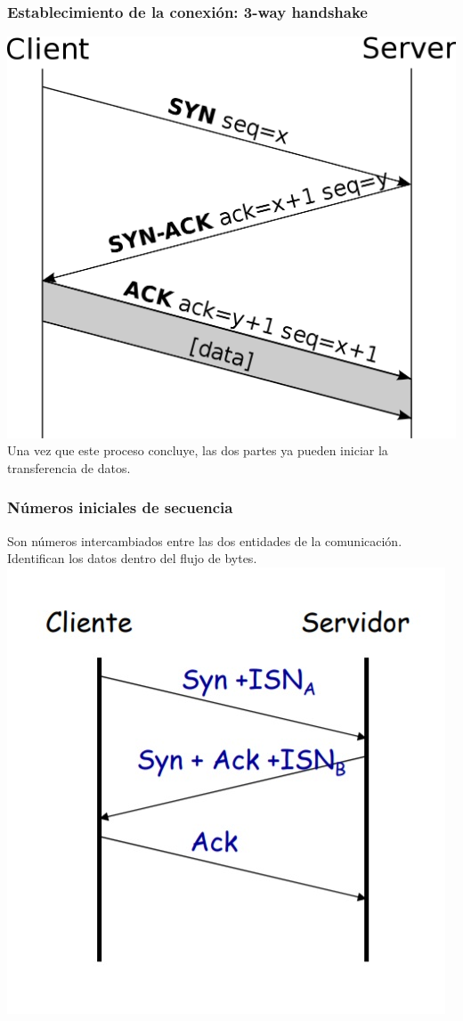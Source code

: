 \documentclass{beamer}
\begin{document}
\begin{frame}
\frametitle{Establecimiento de la conexión: 3-way handshake}
\includegraphics[scale=0.2]{3}\\
\vspace{5mm}
Una vez que este proceso concluye, las dos partes ya pueden iniciar la transferencia de datos.
\end{frame}

\begin{frame}
\frametitle{Números iniciales de secuencia}
Son números intercambiados entre las dos entidades de la comunicación. Identifican los datos dentro del flujo de bytes.
\includegraphics[scale=0.5]{isn}\\
\end{frame}
\end{document}
